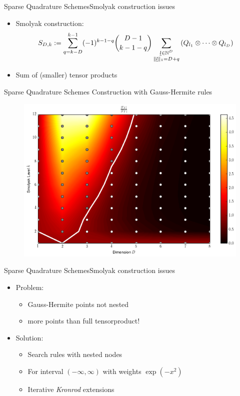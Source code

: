 \documentclass{beamer}
\begin{document}
\begin{frame}{Sparse Quadrature Schemes}{Smolyak construction issues}
  \begin{itemize}
    \item Smolyak construction:
    \begin{equation*}
      S_{D,k} := \sum_{q=k-D}^{k-1} (-1)^{k-1-q} \binom{D-1}{k-1-q}
                      \sum_{\substack{\underline{l} \in \mathbb{N}^D \\
                                      \|\underline{l}\|_1 = D+q}}
                        \left(Q_{l_1} \otimes \cdots \otimes Q_{l_D}\right)
    \end{equation*}
    \vspace{0.2cm}
    \item Sum of (smaller) tensor products
  \end{itemize}
\end{frame}


\begin{frame}{Sparse Quadrature Schemes}
  Construction with Gauss-Hermite rules
  \begin{figure}
    \centering
    \includegraphics[width=0.8\linewidth]{./fig/smolyak_gauss_ratiomap.png}
  \end{figure}
\end{frame}


\begin{frame}{Sparse Quadrature Schemes}{Smolyak construction issues}
  \begin{itemize}
    \item Problem:
    \begin{itemize}
      \item Gauss-Hermite points not nested
      \item more points than full tensorproduct!
    \end{itemize}
    \vspace{0.2cm}
    \item Solution:
    \begin{itemize}
      \item Search rules with nested nodes
      \item For interval $(-\infty, \infty)$ with weights $\exp(-x^2)$
      \item Iterative \emph{Kronrod} extensions
    \end{itemize}
  \end{itemize}
\end{frame}
\end{document}
